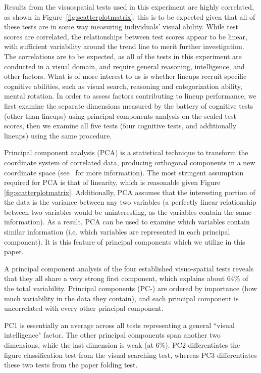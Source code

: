 \documentclass[journal]{vgtc}\usepackage[]{graphicx}\usepackage[]{color}
\begin{document}
Results from the visuospatial tests used in this experiment are highly correlated, as shown in Figure~\ref{fig:scatterplotmatrix}; this is to be expected given that all of these tests are in some way measuring individuals' visual ability. 
While test scores are correlated, the relationships between test scores appear to be linear, with sufficient variability around the trend line to merit further investigation. The correlations are to be expected, as all of the tests in this experiment are conducted in a visual domain, and require general reasoning, intelligence, and other factors. 
What is of more interest to us is whether lineups recruit specific cognitive abilities, such as visual search, reasoning and categorization ability, mental rotation.
In order to assess factors contributing to lineup performance, we first examine the separate dimensions measured by the battery of cognitive tests (other than lineups) using principal components analysis on the scaled test scores, then we examine all five tests (four cognitive tests, and additionally lineups) using the same procedure. 

Principal component analysis (PCA) is a statistical technique to transform the coordinate system of correlated data, producing orthogonal components in a new coordinate space (see~\cite{pcaReference} for more information). The most stringent assumption required for PCA is that of linearity, which is reasonable given Figure \ref{fig:scatterplotmatrix}. Additionally, PCA assumes that the interesting portion of the data is the variance between any two variables (a perfectly linear relationship between two variables would be uninteresting, as the variables contain the same information). As a result, PCA can be used to examine which variables contain similar information (i.e. which variables are represented in each principal component). It is this feature of principal components which we utilize in this paper. 

A principal component analysis of the four established visuo-spatial tests reveals that they all share a very strong first component, which explains about 64\% of the total variability. Principal components (PC-) are ordered by importance (how much variability in the data they contain), and each principal component is uncorrelated with every other principal component. 

PC1 is essentially an average across all tests representing a general ``visual intelligence" factor. The other principal components span another two dimensions, while the last dimension is weak (at 6\%). 
PC2 differentiates the figure classification test from the visual searching test, whereas PC3 differentiates these two tests from the paper folding test. 
\end{document}
